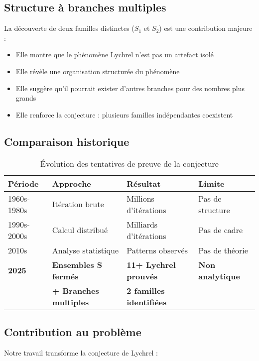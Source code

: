 \documentclass[12pt,a4paper]{article}
\theoremstyle{remark}
\begin{document}
\subsection{Structure à branches multiples}

La découverte de deux familles distinctes ($S_1$ et $S_2$) est une contribution majeure :

\begin{itemize}
\item Elle montre que le phénomène Lychrel n'est pas un artefact isolé
\item Elle révèle une organisation structurée du phénomène
\item Elle suggère qu'il pourrait exister d'autres branches pour des nombres plus grands
\item Elle renforce la conjecture : plusieurs familles indépendantes coexistent
\end{itemize}

\subsection{Comparaison historique}

\begin{table}[h]
\centering
\caption{Évolution des tentatives de preuve de la conjecture}
\begin{tabular}{llll}
\toprule
\textbf{Période} & \textbf{Approche} & \textbf{Résultat} & \textbf{Limite}\\
\midrule
1960s-1980s & Itération brute & Millions d'itérations & Pas de structure\\
1990s-2000s & Calcul distribué & Milliards d'itérations & Pas de cadre\\
2010s & Analyse statistique & Patterns observés & Pas de théorie\\
\textbf{2025} & \textbf{Ensembles S fermés} & \textbf{11+ Lychrel prouvés} & \textbf{Non analytique}\\
 & \textbf{+ Branches multiples} & \textbf{2 familles identifiées} & \\
\bottomrule
\end{tabular}
\end{table}

\subsection{Contribution au problème}

Notre travail transforme la conjecture de Lychrel :
\end{document}
